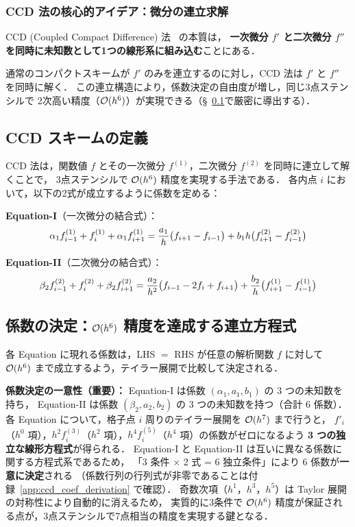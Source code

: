 \subsubsection{CCD 法の核心的アイデア：微分の連立求解}

CCD (Coupled Compact Difference) 法~\cite{ChuFan1998} の本質は，
\textbf{一次微分 $f'$ と二次微分 $f''$ を同時に未知数として1つの線形系に組み込む}ことにある．

通常のコンパクトスキームが $f'$ のみを連立するのに対し，CCD 法は $f'$ と $f''$ を同時に解く．
この連立構造により，係数決定の自由度が増し，同じ3点ステンシルで
2次高い精度（$\mathcal{O}(h^6)$）が実現できる（§~\ref{sec:ccd_def}で厳密に導出する）．

\subsection{CCD スキームの定義}
\label{sec:ccd_def}

CCD 法は，関数値 $f$ とその一次微分 $f^{(1)}$，二次微分 $f^{(2)}$ を同時に連立して解くことで，
3点ステンシルで $\mathcal{O}(h^6)$ 精度を実現する手法である．
各内点 $i$ において，以下の2式が成立するように係数を定める：

\noindent\textbf{Equation-I}（一次微分の結合式）：
\begin{equation}
  \alpha_1f^{(1)}_{i-1} + f^{(1)}_{i} + \alpha_1f^{(1)}_{i+1}
  = \frac{a_1}{h}\bigl(f_{i+1}-f_{i-1}\bigr)
  + b_1 h\bigl(f^{(2)}_{i+1}-f^{(2)}_{i-1}\bigr)
  \label{eq:CCD_I}
\end{equation}

\noindent\textbf{Equation-II}（二次微分の結合式）：
\begin{equation}
  \beta_2f^{(2)}_{i-1} + f^{(2)}_{i} + \beta_2f^{(2)}_{i+1}
  = \frac{a_2}{h^2}\bigl(f_{i-1}-2f_i+f_{i+1}\bigr)
  + \frac{b_2}{h}\bigl(f^{(1)}_{i+1}-f^{(1)}_{i-1}\bigr)
  \label{eq:CCD_II}
\end{equation}

\subsection{係数の決定：\texorpdfstring{$\mathcal{O}(h^6)$}{O(h\^{}6)} 精度を達成する連立方程式}
\label{sec:ccd_te_I}

各 Equation に現れる係数は，LHS $=$ RHS が任意の解析関数 $f$ に対して
$\mathcal{O}(h^6)$ まで成立するよう，テイラー展開で比較して決定される．

\noindent\textbf{係数決定の一意性（重要）：}
Equation-I は係数 $(\alpha_1, a_1, b_1)$ の 3 つの未知数を持ち，
Equation-II は係数 $(\beta_2, a_2, b_2)$ の 3 つの未知数を持つ（合計 6 係数）．
各 Equation について，格子点 $i$ 周りのテイラー展開を $\mathcal{O}(h^7)$ まで行うと，
$f'_i$（$h^0$ 項），$h^2 f^{(3)}_i$（$h^2$ 項），$h^4 f^{(5)}_i$（$h^4$ 項）の係数がゼロになるよう
\textbf{3 つの独立な線形方程式}が得られる．
Equation-I と Equation-II は互いに異なる係数に関する方程式系であるため，
「3 条件 × 2 式 = 6 独立条件」により 6 係数が\textbf{一意に決定}される
（係数行列の行列式が非零であることは付録~\ref{app:ccd_coef_derivation} で確認）．
奇数次項（$h^1$，$h^3$，$h^5$）は Taylor 展開の対称性により自動的に消えるため，
実質的に3条件で $\mathcal{O}(h^6)$ 精度が保証される点が，3点ステンシルで7点相当の精度を実現する鍵となる．

